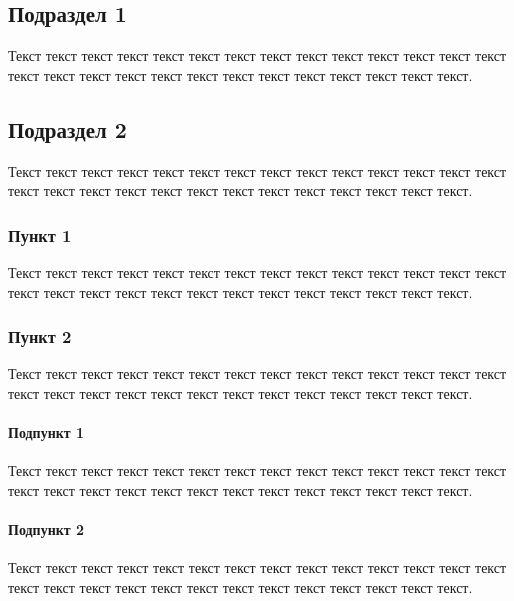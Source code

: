 \subsection{Подраздел 1}
Текст текст текст текст текст текст текст текст текст текст текст текст текст текст текст текст текст текст текст текст текст текст текст текст текст текст текст.

\subsection{Подраздел 2}
Текст текст текст текст текст текст текст текст текст текст текст текст текст текст текст текст текст текст текст текст текст текст текст текст текст текст текст.

\subsubsection{Пункт 1} 
Текст текст текст текст текст текст текст текст текст текст текст текст текст текст текст текст текст текст текст текст текст текст текст текст текст текст текст.

\subsubsection{Пункт 2} 
Текст текст текст текст текст текст текст текст текст текст текст текст текст текст текст текст текст текст текст текст текст текст текст текст текст текст текст.

\paragraph{Подпункт 1} 
Текст текст текст текст текст текст текст текст текст текст текст текст текст текст текст текст текст текст текст текст текст текст текст текст текст текст текст.

\paragraph{Подпункт 2} 
Текст текст текст текст текст текст текст текст текст текст текст текст текст текст текст текст текст текст текст текст текст текст текст текст текст текст текст.
